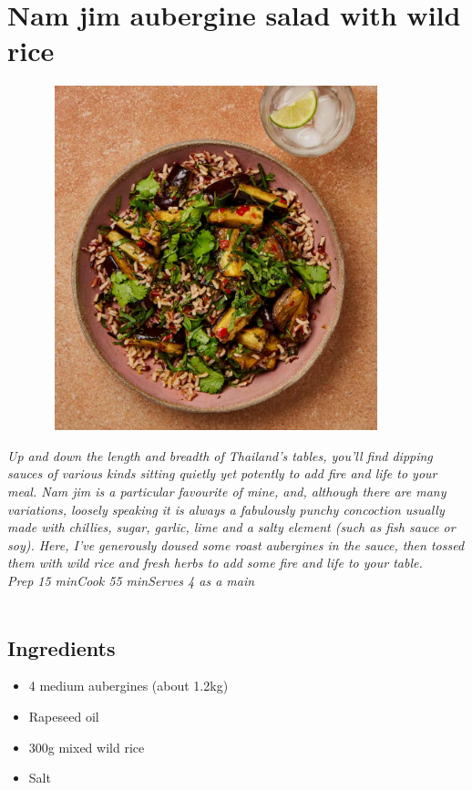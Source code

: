 \documentclass{book}
\begin{document}
\section{Nam jim aubergine salad with wild rice}
\begin{figure}
\centering\includegraphics[width=10cm,height=10cm,keepaspectratio]{Recipe_Pictures/Nam_jim_aubergine_salad_with_wild_rice.png}
\end{figure}
\emph{Up and down the length and breadth of Thailand’s tables, you’ll find dipping sauces of various kinds sitting quietly yet potently to add fire and life to your meal. Nam jim is a particular favourite of mine, and, although there are many variations, loosely speaking it is always a fabulously punchy concoction usually made with chillies, sugar, garlic, lime and a salty element (such as fish sauce or soy). Here, I’ve generously doused some roast aubergines in the sauce, then tossed them with wild rice and fresh herbs to add some fire and life to your table.\\ 
Prep 15 minCook 55 minServes 4 as a main}\\\\ 
\subsection*{Ingredients}
\begin{itemize}
\item 4 medium aubergines (about 1.2kg)
\item Rapeseed oil 
\item 300g mixed wild rice 
\item Salt
\end{itemize}
\end{document}
